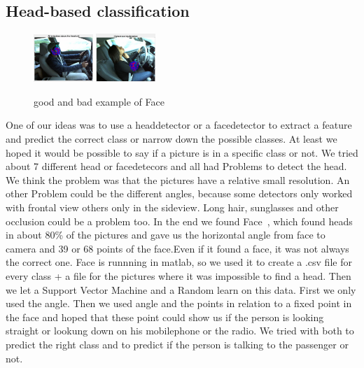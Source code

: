 \documentclass[10pt,twocolumn,letterpaper]{article}
\begin{document}
\subsection{Head-based classification}
\begin{figure}[h]
	\centering
	\includegraphics[width=0.2\textwidth]{face1}\hspace{0.01\textwidth}
	\includegraphics[width=0.2\textwidth]{faces/face7}\\ \vspace{0.01\textwidth}
	\caption{good and bad example of Face}
	\label{face_estimation_example}
\end{figure}
One of our ideas was to use a headdetector or a facedetector to extract a feature and predict the correct class or narrow down the possible classes. At least we hoped it would be possible to say if a picture is in a specific class or not. We tried about 7 different head or facedetecors and all had Problems to detect the head. We think the problem was that the pictures have a relative small resolution. An other Problem could be the different angles, because some detectors only worked with frontal view others only in the sideview. Long hair, sunglasses and other occlusion could be a problem too. In the end we found Face~\cite{Ramanan:2012:FDP:2354409.2355119}, which found heads in about 80\% of the pictures and gave us the horizontal angle from face to camera and 39 or 68 points of the face.Even if it found a face, it was not always the correct one. Face is runnning in matlab, so we used it to create a .csv file for every class + a file for the pictures where it was impossible to find a head. Then we let a Support Vector Machine and a Random learn on this data. First we only used the angle. Then we used angle and the points in relation to a fixed point in the face and hoped that these point could show us if the person is looking straight or lookung down on his mobilephone or the radio. We tried with both to predict the right class and to predict if the person is talking to the passenger or not.
\end{document}
